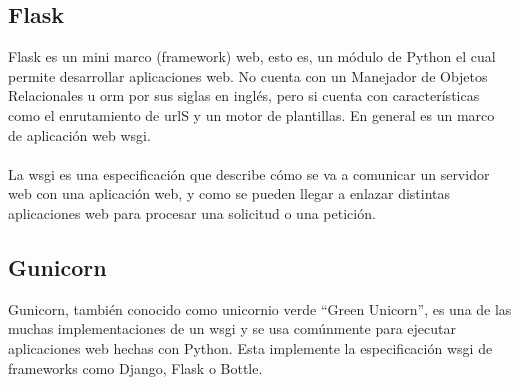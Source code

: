 \documentclass[12pt, a4paper, titlepage]{article}
\begin{document}
	\subsection{Flask}
	Flask es un mini marco (framework) web, esto es, un módulo de Python el cual permite desarrollar aplicaciones web. No cuenta con un Manejador de Objetos Relacionales u \acrshort{orm} por sus siglas en inglés, pero si cuenta con características como el enrutamiento de \acrshort{url}S y un motor de plantillas. En general es un marco de aplicación web \acrshort{wsgi}.\\\\
	La \acrfull{wsgi} es una especificación que describe cómo se va a comunicar un servidor web con una aplicación web, y como se pueden llegar a enlazar distintas aplicaciones web para procesar una solicitud o una petición.
	\subsection{Gunicorn}
	Gunicorn, también conocido como unicornio verde “Green Unicorn”, es una de las muchas implementaciones de un \acrfull{wsgi} y se usa comúnmente para ejecutar aplicaciones web hechas con Python. Esta implemente la especificación \acrshort{wsgi} de frameworks como Django, Flask o Bottle.
\end{document}
